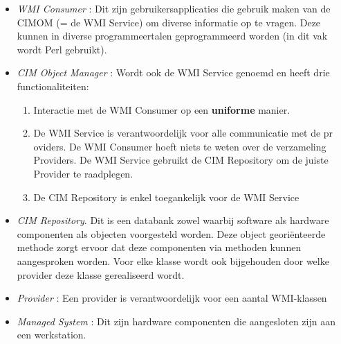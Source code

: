 \documentclass{report}
\begin{document}
	\begin{itemize}
		\item \textit{WMI Consumer} : Dit zijn gebruikersapplicaties die gebruik maken van de CIMOM (= de WMI Service) om diverse informatie op te vragen. Deze kunnen in diverse programmeertalen geprogrammeerd worden (in dit vak wordt Perl gebruikt).
		\item \textit{CIM Object Manager} : Wordt ook de WMI Service genoemd en heeft drie functionaliteiten: 
		\begin{enumerate}
			\item Interactie met de WMI Consumer op een \textbf{uniforme} manier.
			\item De WMI Service is verantwoordelijk voor alle communicatie met de pr oviders. De WMI Consumer hoeft niets te weten over de verzameling Providers. De WMI Service gebruikt de CIM Repository om de juiste Provider te raadplegen.
			\item De CIM Repository is enkel toegankelijk voor de WMI Service
		\end{enumerate}
		\item \textit{CIM Repository}. Dit is een databank zowel waarbij software als hardware componenten als objecten voorgesteld worden.  Deze object georiënteerde methode zorgt ervoor dat deze componenten via methoden kunnen aangesproken worden. Voor elke klasse wordt ook bijgehouden door welke provider deze klasse gerealiseerd wordt.
		\item \textit{Provider} : Een provider is verantwoordelijk voor een aantal WMI-klassen
		\item \textit{Managed System} : Dit zijn hardware componenten die aangesloten zijn aan een werkstation.
	\end{itemize}
\end{document}
